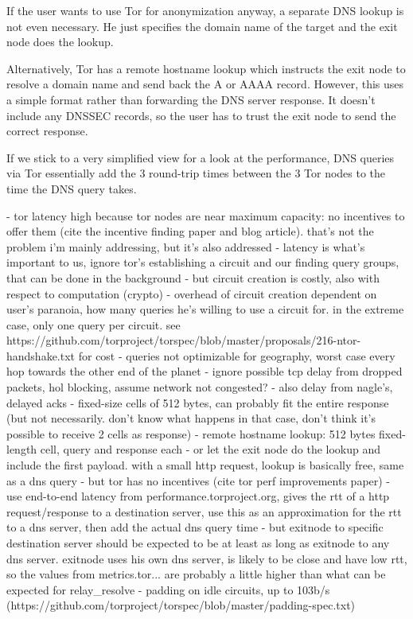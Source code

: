 If the user wants to use Tor for anonymization anyway, a separate DNS lookup is
not even necessary. He just specifies the domain name of the target and the exit
node does the lookup.

Alternatively, Tor has a remote hostname lookup which instructs the exit node to
resolve a domain name and send back the A or AAAA record. However, this uses a
simple format rather than forwarding the DNS server response. It doesn't include
any DNSSEC records, so the user has to trust the exit node to send the correct
response.

If we stick to a very simplified view for a look at the performance, DNS queries
via Tor essentially add the 3 round-trip times between the 3 Tor nodes to the
time the DNS query takes.

- tor latency high because tor nodes are near maximum capacity: no incentives to
  offer them (cite the incentive finding paper and blog article). that's not the
  problem i'm mainly addressing, but it's also addressed
- latency is what's important to us, ignore tor's establishing a circuit and our
  finding query groups, that can be done in the background
- but circuit creation is costly, also with respect to computation (crypto)
- overhead of circuit creation dependent on user's paranoia, how many queries
  he's willing to use a circuit for. in the extreme case, only one query per
  circuit. see
  https://github.com/torproject/torspec/blob/master/proposals/216-ntor-handshake.txt
  for cost
- queries not optimizable for geography, worst case every hop towards the other
  end of the planet
- ignore possible tcp delay from dropped packets, hol blocking, assume network
  not congested?
    - also delay from nagle's, delayed acks
- fixed-size cells of 512 bytes, can probably fit the entire response (but not
  necessarily. don't know what happens in that case, don't think it's possible
  to receive 2 cells as response)
- remote hostname lookup: 512 bytes fixed-length cell, query and response each
- or let the exit node do the lookup and include the first payload. with a small
  http request, lookup is basically free, same as a dns query
- but tor has no incentives (cite tor perf improvements paper)
- use end-to-end latency from performance.torproject.org, gives the rtt of a
  http request/response to a destination server, use this as an approximation
  for the rtt to a dns server, then add the actual dns query time
    - but exitnode to specific destination server should be expected to be at
      least as long as exitnode to any dns server. exitnode uses his own dns
      server, is likely to be close and have low rtt, so the values from
      metrics.tor... are probably a little higher than what can be expected for
      relay\_resolve
- %
  padding on idle circuits, up to 103b/s
  (https://github.com/torproject/torspec/blob/master/padding-spec.txt)
